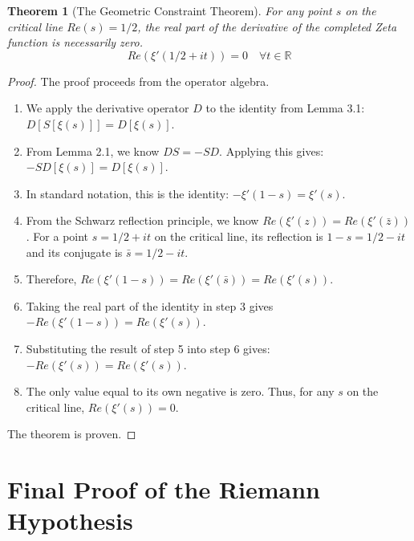 \documentclass{article}
\newtheorem{theorem}{Theorem}[section]
\begin{document}
\begin{theorem}[The Geometric Constraint Theorem]
For any point $s$ on the critical line $Re(s)=1/2$, the real part of the derivative of the completed Zeta function is necessarily zero.
$$ Re(\xi'(1/2 + it)) = 0 \quad \forall t \in \mathbb{R} $$
\end{theorem}
\begin{proof}
The proof proceeds from the operator algebra.
\begin{enumerate}
    \item We apply the derivative operator $D$ to the identity from Lemma 3.1: $D[S[\xi(s)]] = D[\xi(s)]$.
    \item From Lemma 2.1, we know $DS = -SD$. Applying this gives: $-SD[\xi(s)] = D[\xi(s)]$.
    \item In standard notation, this is the identity: $-\xi'(1-s) = \xi'(s)$.
    \item From the Schwarz reflection principle, we know $Re(\xi'(z)) = Re(\xi'(\bar{z}))$. For a point $s=1/2+it$ on the critical line, its reflection is $1-s=1/2-it$ and its conjugate is $\bar{s}=1/2-it$.
    \item Therefore, $Re(\xi'(1-s)) = Re(\xi'(\bar{s})) = Re(\xi'(s))$.
    \item Taking the real part of the identity in step 3 gives $ -Re(\xi'(1-s)) = Re(\xi'(s)) $.
    \item Substituting the result of step 5 into step 6 gives: $ -Re(\xi'(s)) = Re(\xi'(s)) $.
    \item The only value equal to its own negative is zero. Thus, for any $s$ on the critical line, $Re(\xi'(s)) = 0$.
\end{enumerate}
The theorem is proven.
\end{proof}

\section{Final Proof of the Riemann Hypothesis}
\end{document}
